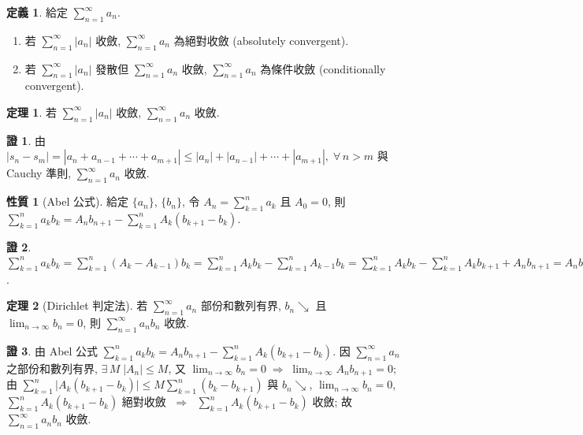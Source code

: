 \documentclass[12pt]{extarticle}
\newcommand{\ds}{\displaystyle}
\newcommand{\ie}{\;\Longrightarrow\;}
\theoremstyle{definition}
\newtheorem*{dfn}{定義}
\newtheorem*{prp}{性質}
\newtheorem*{thm}{定理}
\newtheorem*{prf}{證}
\begin{document}
\begin{dfn}
  給定 $\ds\sum_{n = 1}^\infty a_n$. 
  \begin{enumerate}\setlength{\itemsep}{0pt}
    \item 若 $\ds\sum_{n = 1}^\infty|a_n|$ 收斂, $\ds\sum_{n = 1}^\infty a_n$ 為絕對收斂 (absolutely convergent). 
    \item 若 $\ds\sum_{n = 1}^\infty|a_n|$ 發散但 $\ds\sum_{n = 1}^\infty a_n$ 收斂, $\ds\sum_{n = 1}^\infty a_n$ 為條件收斂 (conditionally convergent). 
  \end{enumerate}
\end{dfn}

\begin{thm}
  若 $\ds\sum_{n = 1}^\infty|a_n|$ 收斂, $\ds\sum_{n = 1}^\infty a_n$ 收斂. 
\end{thm}

\begin{prf}
  由 $\ds|s_n - s_m| = |a_n + a_{n - 1} + \cdots + a_{m + 1}|\leqslant|a_n| + |a_{n - 1}| + \cdots + |a_{m + 1}|,\;\forall\,n > m$ 與 Cauchy 準則, $\ds\sum_{n = 1}^\infty a_n$ 收斂. 
\end{prf}

\begin{prp}[Abel 公式]
  給定 $\ds\{a_n\}$, $\ds\{b_n\}$, 令 $\ds A_n = \sum_{k = 1}^n a_k$ 且 $A_0 = 0$, 則 $\ds\sum_{k = 1}^n a_k b_k = A_n b_{n + 1} - \sum_{k = 1}^n A_k(b_{k + 1} - b_k)$. 
\end{prp}

\begin{prf}
  $\ds\sum_{k = 1}^n a_k b_k = \sum_{k = 1}^n (A_k - A_{k - 1}) b_k = \sum_{k = 1}^n A_k b_k - \sum_{k = 1}^n A_{k - 1} b_k = \sum_{k = 1}^n A_k b_k - \sum_{k = 1}^n A_k b_{k + 1} + A_n b_{n + 1} = A_n b_{n + 1} - \sum_{k = 1}^n A_k (b_{k + 1} - b_k)$. 
\end{prf}

\begin{thm}[Dirichlet 判定法]
  若 $\ds\sum_{n = 1}^\infty a_n$ 部份和數列有界, $\ds b_n\searrow$ 且 $\ds\lim_{n\to\infty}b_n = 0$, 則 $\ds\sum_{n = 1}^\infty a_n b_n$ 收斂.  
\end{thm}

\begin{prf}
  由 Abel 公式 $\ds\sum_{k = 1}^n a_k b_k = A_n b_{n + 1} - \sum_{k = 1}^n A_k(b_{k + 1} - b_k)$. 因 $\ds\sum_{n = 1}^\infty a_n$ 之部份和數列有界, $\ds\exists\,M\;|A_n|\leqslant M$, 又 $\ds\lim_{n\to\infty}b_n = 0 \ie \lim_{n\to\infty}A_n b_{n + 1} = 0$; 由 $\ds\sum_{k = 1}^n \Big|A_k(b_{k + 1} - b_k)\Big|\leqslant M\sum_{k = 1}^n(b_k - b_{k + 1})$ 與 $\ds b_n\searrow$, $\ds\lim_{n\to\infty}b_n = 0$, $\ds\sum_{k = 1}^n A_k(b_{k + 1} - b_k)$ 絕對收斂 $\ie$ $\ds\sum_{k = 1}^n A_k(b_{k + 1} - b_k)$ 收斂; 故 $\ds\sum_{n = 1}^\infty a_n b_n$ 收斂. 
\end{prf}
\end{document}
